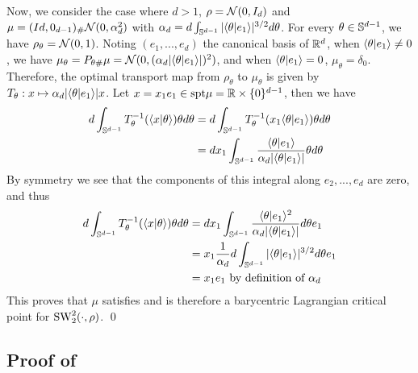 Now, we consider the case where $d > 1$, $\rho = \mathcal N(0,I_d)$ and $\mu = (Id,0_{d-1})_\# \mathcal N(0,\alpha_d^2)$ with $\alpha_d = d\int_{\mathbb S^{d-1}} |\langle\theta|e_1\rangle|^{3/2} d\theta$. For every $\theta \in \mathbb S^{d-1}$, we have $\rho_\theta = \mathcal N(0,1)$. Noting $(e_1,...,e_d)$ the canonical basis of $\mathbb R^d$, when $\langle\theta|e_1\rangle \neq 0$, we have $\mu_\theta = P_{\theta\#}\mu = \mathcal N(0,(\alpha_d|\langle\theta|e_1\rangle|)^2)$, and when $\langle\theta|e_1\rangle = 0$, $\mu_\theta = \delta_0$. Therefore, the optimal transport map from $\rho_\theta$ to $\mu_\theta$ is given by $T_\theta : x \mapsto \alpha_d|\langle\theta|e_1\rangle|x$. Let $x = x_1 e_1 \in \mathrm{spt} \mu = \mathbb R \times \{0\}^{d-1}$, then we have
\begin{align}
    d \int_{\mathbb S^{d-1}} T_\theta^{-1}(\langle x|\theta\rangle) \theta d\theta 
        &= d \int_{\mathbb S^{d-1}} T_\theta^{-1}(x_1\langle\theta|e_1\rangle) \theta d\theta \\
        &= d x_1 \int_{\mathbb S^{d-1}} \frac{\langle\theta|e_1\rangle}{\alpha_d|\langle\theta|e_1\rangle|} \theta d\theta \\
\end{align}
By symmetry we see that the components of this integral along $e_2,...,e_d$ are zero, and thus
\begin{align}
    d \int_{\mathbb S^{d-1}} T_\theta^{-1}(\langle x|\theta\rangle) \theta d\theta 
        &= d x_1 \int_{\mathbb S^{d-1}} \frac{\langle\theta|e_1\rangle^2}{\alpha_d|\langle\theta|e_1\rangle|} d\theta e_1 \\
        &= x_1 \frac{1}{\alpha_d} d\int_{\mathbb S^{d-1}}|\langle\theta|e_1\rangle|^{3/2} d\theta e_1 \\
        &= x_1 e_1 \hbox{ by definition of } \alpha_d
\end{align}
This proves that $\mu$ satisfies  and is therefore a barycentric Lagrangian critical point for $\mathop{\mathrm{SW}}\nolimits^2_2(\cdot,\rho)$. \qed

\subsection{Proof of \texorpdfstring{}{}} \label{sec:proof_examples_unstable}

